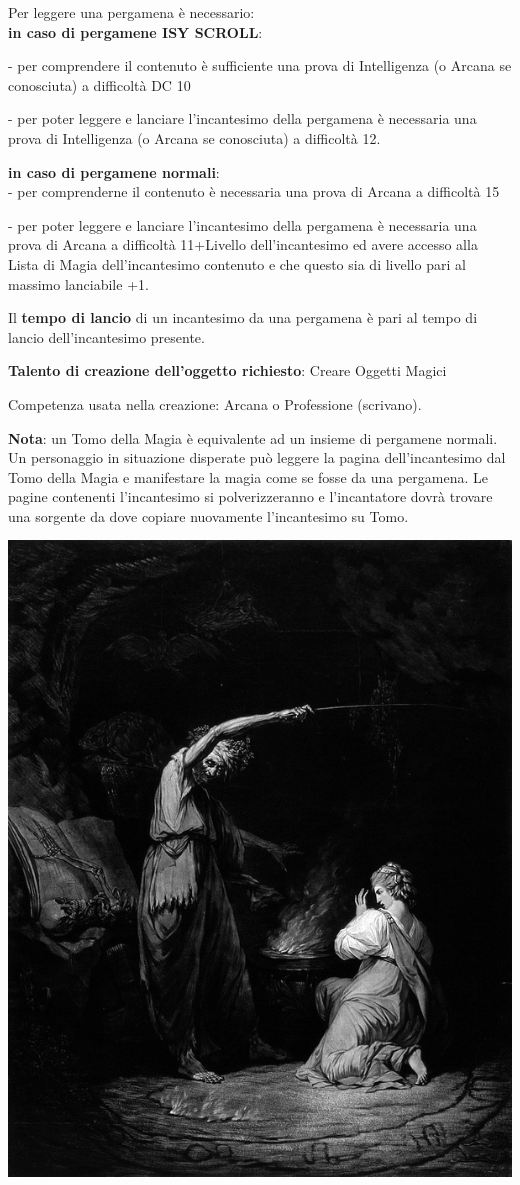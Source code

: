 \begin{multicols}{2}
\medskip

Per leggere una pergamena è necessario:\\

\textbf{in caso di pergamene ISY SCROLL}:

- per comprendere il contenuto è sufficiente una prova di Intelligenza (o Arcana se conosciuta) a difficoltà DC 10

- per poter leggere e lanciare l'incantesimo della pergamena è necessaria una prova di Intelligenza (o Arcana se conosciuta) a difficoltà 12.\\

\medskip

\textbf{in caso di pergamene normali}:\\

- per comprenderne il contenuto è necessaria una prova di Arcana a difficoltà 15

- per poter leggere e lanciare l'incantesimo della pergamena è necessaria una prova di Arcana a difficoltà 11+Livello dell'incantesimo ed avere accesso alla Lista di Magia dell'incantesimo contenuto e che questo sia di livello pari al massimo lanciabile +1.

\medskip

Il \textbf{tempo di lancio} di un incantesimo da una pergamena è pari al tempo di lancio dell'incantesimo presente.

\textbf{Talento di creazione dell'oggetto richiesto}: Creare Oggetti Magici

Competenza usata nella creazione: Arcana o Professione (scrivano).

\textbf{Nota}: un Tomo della Magia è equivalente ad un insieme di pergamene normali. Un personaggio in situazione disperate può leggere la pagina dell'incantesimo dal Tomo della Magia e manifestare la magia come se fosse da una pergamena. Le pagine contenenti l'incantesimo si polverizzeranno e l'incantatore dovrà trovare una sorgente da dove copiare nuovamente l'incantesimo su Tomo.

\begin{center}
\includegraphics[width=0.6\linewidth]{immagini/potion2.png}


\end{center}
\end{multicols}
